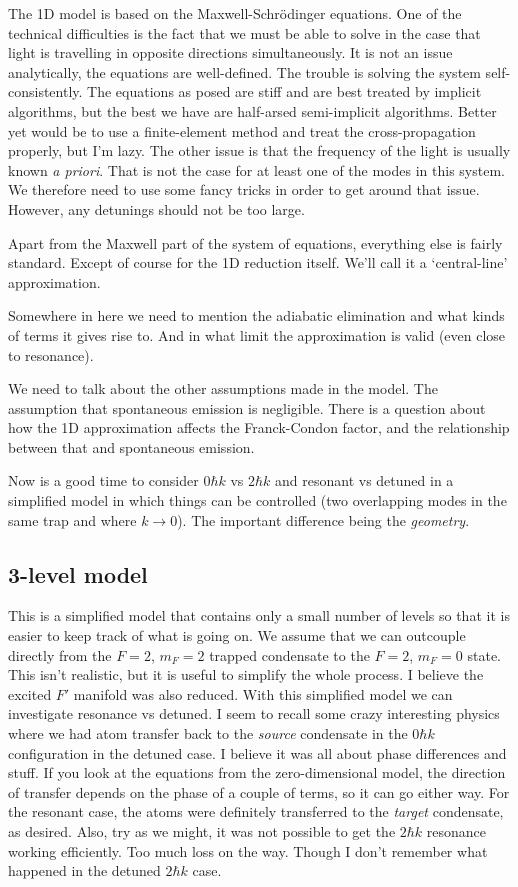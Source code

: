 The 1D model is based on the Maxwell-Schrödinger equations.  One of the technical difficulties is the fact that we must be able to solve in the case that light is travelling in opposite directions simultaneously.  It is not an issue analytically, the equations are well-defined.  The trouble is solving the system self-consistently.  The equations as posed are stiff and are best treated by implicit algorithms, but the best we have are half-arsed semi-implicit algorithms. Better yet would be to use a finite-element method and treat the cross-propagation properly, but I'm lazy.  The other issue is that the frequency of the light is usually known \emph{a priori}.  That is not the case for at least one of the modes in this system.  We therefore need to use some fancy tricks in order to get around that issue.  However, any detunings should not be too large.

Apart from the Maxwell part of the system of equations, everything else is fairly standard.  Except of course for the 1D reduction itself.  We'll call it a `central-line' approximation.

Somewhere in here we need to mention the adiabatic elimination and what kinds of terms it gives rise to.  And in what limit the approximation is valid (even close to resonance).

We need to talk about the other assumptions made in the model.  The assumption that spontaneous emission is negligible.  There is a question about how the 1D approximation affects the Franck-Condon factor, and the relationship between that and spontaneous emission.

Now is a good time to consider $0 \hbar k$ vs $2 \hbar k$ and resonant vs detuned in a simplified model in which things can be controlled (two overlapping modes in the same trap and where $k \rightarrow 0$). The important difference being the \emph{geometry}.

\subsection{3-level model}

This is a simplified model that contains only a small number of levels so that it is easier to keep track of what is going on.  We assume that we can outcouple directly from the $F=2$, $m_F=2$ trapped condensate to the $F=2$, $m_F=0$ state. This isn't realistic, but it is useful to simplify the whole process.  I believe the excited $F'$ manifold was also reduced.  With this simplified model we can investigate resonance vs detuned.  I seem to recall some crazy interesting physics where we had atom transfer back to the \emph{source} condensate in the $0 \hbar k$ configuration in the detuned case.  I believe it was all about phase differences and stuff.  If you look at the equations from the zero-dimensional model, the direction of transfer depends on the phase of a couple of terms, so it can go either way.  For the resonant case, the atoms were definitely transferred to the \emph{target} condensate, as desired.  Also, try as we might, it was not possible to get the $2 \hbar k$ resonance working efficiently.  Too much loss on the way.  Though I don't remember what happened in the detuned $2 \hbar k$ case.

